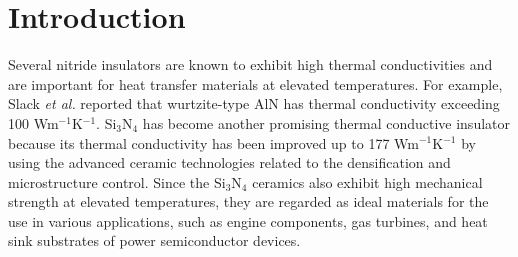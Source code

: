 \documentclass[twocolumn,amsmath,amssymb,a4paper,prb,superscriptaddress,floatfix]{revtex4-1}
\begin{document}
\section{Introduction}
Several nitride insulators are known to exhibit high thermal conductivities and
are important for heat transfer materials at elevated temperatures. For example,
Slack {\it et al.}\cite{slack} reported that wurtzite-type AlN has thermal
conductivity exceeding 100 Wm$^{-1}$K$^{-1}$. Si$_3$N$_4$ has become another
promising thermal conductive insulator because its thermal conductivity has been
improved up to 177 Wm$^{-1}$K$^{-1}$ by using the advanced ceramic technologies
related to the densification and microstructure
control.\cite{zhou,hirao-rev,watari,hirosaki} Since the Si$_3$N$_4$ ceramics
also exhibit high mechanical strength at elevated temperatures, they are
regarded as ideal materials for the use in various applications, such as engine
components, gas turbines, and heat sink substrates of power semiconductor
devices.
\end{document}
